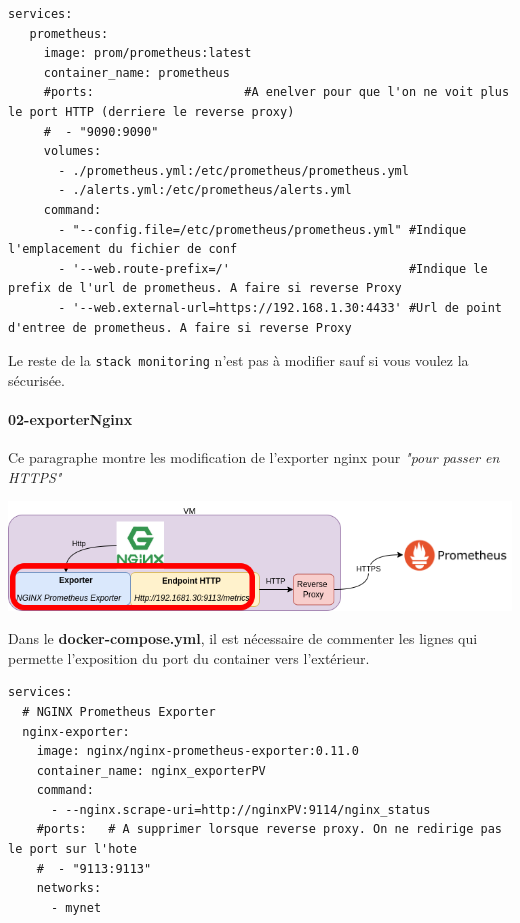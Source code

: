 \documentclass[french, 12pt]{article}%
\begin{document}
\begin{lstlisting}[style = commande]
 services:                                                                                                                                                                                 
   prometheus:
     image: prom/prometheus:latest
     container_name: prometheus
     #ports:                     #A enelver pour que l'on ne voit plus le port HTTP (derriere le reverse proxy)
     #  - "9090:9090"
     volumes:
       - ./prometheus.yml:/etc/prometheus/prometheus.yml
       - ./alerts.yml:/etc/prometheus/alerts.yml
     command:
       - "--config.file=/etc/prometheus/prometheus.yml" #Indique l'emplacement du fichier de conf
       - '--web.route-prefix=/'                         #Indique le prefix de l'url de prometheus. A faire si reverse Proxy
       - '--web.external-url=https://192.168.1.30:4433' #Url de point d'entree de prometheus. A faire si reverse Proxy 

\end{lstlisting}

Le reste de la \verb?stack monitoring? n'est pas à modifier sauf si vous voulez la sécurisée.


\paragraph{02-exporterNginx}
Ce paragraphe montre les modification de l'exporter nginx pour \textit{"pour passer en HTTPS"}
\begin{center}
\includegraphics[scale=0.5]{./ressource/etapeExporter.png}
\end{center}

Dans le \textbf{docker-compose.yml},  il est nécessaire de commenter les lignes qui permette l'exposition du port du container vers l'extérieur.

\begin{lstlisting}[style = commande]
services:                                                                                                                                                                                     
  # NGINX Prometheus Exporter
  nginx-exporter:
    image: nginx/nginx-prometheus-exporter:0.11.0
    container_name: nginx_exporterPV
    command:
      - --nginx.scrape-uri=http://nginxPV:9114/nginx_status
    #ports:   # A supprimer lorsque reverse proxy. On ne redirige pas le port sur l'hote
    #  - "9113:9113"
    networks:
      - mynet
\end{lstlisting}
\end{document}

